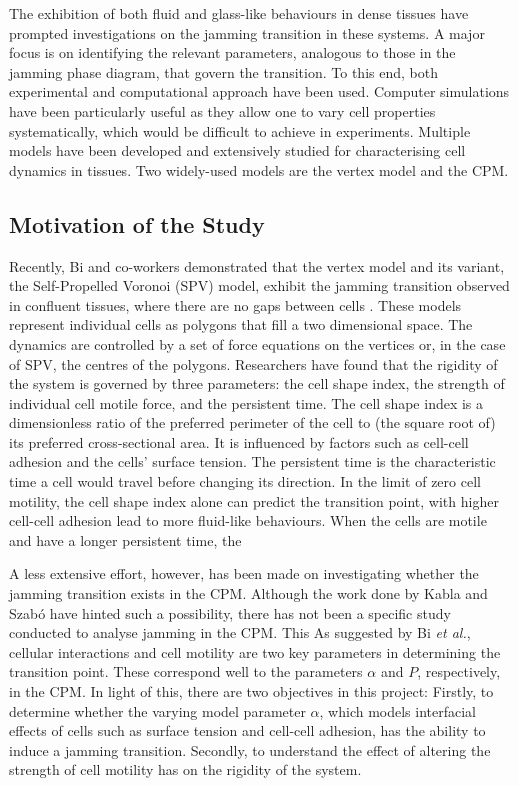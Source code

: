 \documentclass[a4paper,12pt]{article}
\begin{document}
The exhibition of both fluid and glass-like behaviours in dense tissues have prompted investigations on the jamming transition in these systems. A major focus is on identifying the relevant parameters, analogous to those in the jamming phase diagram, that govern the transition. To this end, both experimental and computational approach have been used. Computer simulations have been particularly useful as they allow one to vary cell properties systematically, which would be difficult to achieve in experiments. Multiple models have been developed and extensively studied for characterising cell dynamics in tissues. Two widely-used models are the vertex model and the CPM.  

\subsection{Motivation of the Study}
Recently, Bi and co-workers demonstrated that the vertex model and its variant, the Self-Propelled Voronoi (SPV) model, exhibit the jamming transition observed in confluent tissues, where there are no gaps between cells \cite{bi2015density, bi2015motility}. These models represent individual cells as polygons that fill a two dimensional space. The dynamics are controlled by a set of force equations on the vertices or, in the case of SPV, the centres of the polygons. Researchers have found that the rigidity of the system is governed by three parameters: the cell shape index, the strength of individual cell motile force, and the persistent time. The cell shape index is a dimensionless ratio of the preferred perimeter of the cell to (the square root of) its preferred cross-sectional area. It is influenced by factors such as cell-cell adhesion and the cells' surface tension. The persistent time is the characteristic time a cell would travel before changing its direction. In the limit of zero cell motility, the cell shape index alone can predict the transition point, with higher cell-cell adhesion lead to more fluid-like behaviours. When the cells are motile and have a longer persistent time, the 

A less extensive effort, however, has been made on investigating whether the jamming transition exists in the CPM. Although the work done by Kabla \cite{kabla2012} and Szab\'o \cite{szabo2010} have hinted such a possibility, there has not been a specific study conducted to analyse jamming in the CPM.  This As suggested by Bi \emph{et al.}, cellular interactions and cell motility are two key parameters in determining the transition point. These correspond well to the parameters $\alpha$ and $P$, respectively, in the CPM. In light of this, there are two objectives in this project: Firstly, to determine whether the varying model parameter $\alpha$, which models interfacial effects of cells such as surface tension and cell-cell adhesion, has the ability to induce a jamming transition. Secondly, to understand the effect of altering the strength of cell motility has on the rigidity of the system.
\end{document}

